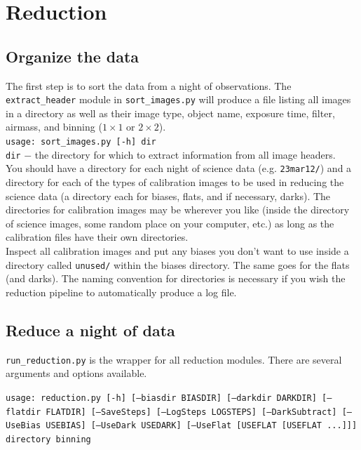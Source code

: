 \documentclass{article}
\begin{document}
\vspace{3 mm}
\section{Reduction}
\subsection{Organize the data}
The first step is to sort the data from a night of observations. 
The \texttt{extract\_header} module in \texttt{sort\_images.py} will
produce a file listing all images in a directory as well as their
image type, object name, exposure time, filter, airmass, and binning 
($1\times1$ or $2\times2$).\\

\texttt{usage: sort\_images.py [-h] dir} \\

\texttt{dir} $-$ \hangindent=2.7cm the directory for which to extract
information from all image headers.\\

\noindent You should have a directory for each night of science data (e.g.
\texttt{23mar12/}) and a directory for each of the types of calibration 
images to be used in reducing the science data (a directory each for 
biases, flats, and if necessary, darks). The directories for calibration 
images may be wherever you like (inside the
directory of science images, some random place on your computer, etc.)
as long as the calibration files have their own directories. \\

\noindent Inspect all calibration images and put any biases you don't 
want to use inside a directory called \texttt{unused/} within the biases 
directory. The same goes for the flats (and darks). The naming convention
for directories is necessary if you wish the reduction pipeline to 
automatically produce a log file. 

\subsection{Reduce a night of data}
\texttt{run\_reduction.py} is the wrapper for all reduction modules. There 
are several arguments and options available.

\hangindent=3cm \texttt{usage: reduction.py [-h] [--biasdir BIASDIR] 
    [--darkdir DARKDIR] [--flatdir FLATDIR] [--SaveSteps] 
    [--LogSteps LOGSTEPS] [--DarkSubtract] [--UseBias USEBIAS] 
    [--UseDark USEDARK] [--UseFlat [USEFLAT [USEFLAT ...]]] directory binning}\\
\end{document}
